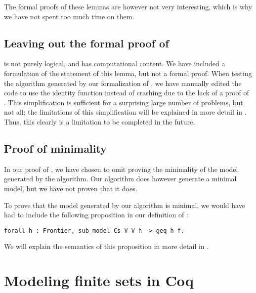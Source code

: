 The formal proofs of these lemmas are however not very interesting,
which is why we have not spent too much time on them.

\subsection{Leaving out the formal proof of }
\label{ssec:leaving_out_the_formal_proof_of_lem_33}

 is not purely logical, and has computational content.
We have included a formulation of the statement of this lemma, but not a formal proof.
When testing the algorithm generated by our formalization of ,
we have manually edited the code to use the identity function instead of crashing due to
the lack of a proof of .
This simplification is sufficient for a surprising large number of problems, but not all;
the limitations of this simplification will be explained in more detail in .
Thus, this clearly is a limitation to be completed in the future.

\subsection{Proof of minimality}
\label{ssec:proof_of_minimality}

In our proof of , we have chosen to omit proving the minimality of the model generated by the algorithm.
Our algorithm does however generate a minimal model, but we have not proven
that it does.

To prove that the model generated by our algorithm is minimal,
we would have had to include the following proposition in our definition of :

\begin{minipage}{\linewidth}
\begin{lstlisting}[language=Coq, label={lst:minimal_model}, caption={Proposition for minimal model}]
forall h : Frontier, sub_model Cs V V h -> geq h f.
\end{lstlisting}
\end{minipage}

We will explain the semantics of this proposition in more detail in .

\section{Modeling finite sets in Coq}
\label{sec:modeling_finite_sets_in_coq}

